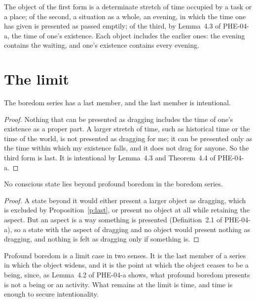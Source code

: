 \documentclass{situationist-preprint}
\begin{document}
The object of the first form is a determinate stretch of time occupied by a task or a place; of the second, a situation as a whole, an evening, in which the time one has given is presented as passed emptily; of the third, by Lemma~4.3 of PHE-04-a, the time of one's existence. Each object includes the earlier ones: the evening contains the waiting, and one's existence contains every evening.

\section{The limit}

\begin{proposition}\label{p:last}
The boredom series has a last member, and the last member is intentional.
\end{proposition}

\begin{proof}
Nothing that can be presented as dragging includes the time of one's existence as a proper part. A larger stretch of time, such as historical time or the time of the world, is not presented as dragging for me; it can be presented only as the time within which my existence falls, and it does not drag for anyone. So the third form is last. It is intentional by Lemma~4.3 and Theorem~4.4 of PHE-04-a.
\end{proof}

\begin{proposition}\label{p:noextension}
No conscious state lies beyond profound boredom in the boredom series.
\end{proposition}

\begin{proof}
A state beyond it would either present a larger object as dragging, which is excluded by Proposition~\ref{p:last}, or present no object at all while retaining the aspect. But an aspect is a way something is presented (Definition~2.1 of PHE-04-a), so a state with the aspect of dragging and no object would present nothing as dragging, and nothing is felt as dragging only if something is.
\end{proof}

Profound boredom is a limit case in two senses. It is the last member of a series in which the object widens, and it is the point at which the object ceases to be a being, since, as Lemma~4.2 of PHE-04-a shows, what profound boredom presents is not a being or an activity. What remains at the limit is time, and time is enough to secure intentionality.
\end{document}
